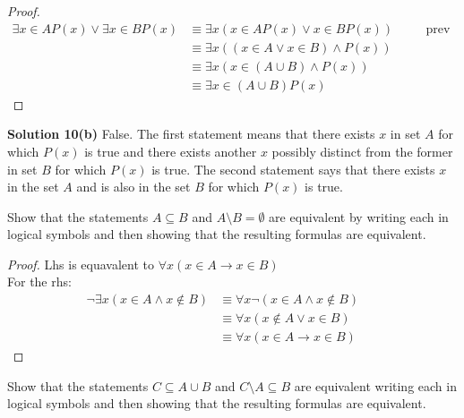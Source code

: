 \begin{proof}
    \begin{align*}
        \exists{x} \in A P(x) \vee \exists{x} \in B P(x) 
            &\equiv \exists{x} (x \in A P(x) \vee x \in B P(x)) && \quad \text {prev prob} \\
            &\equiv \exists{x} ((x \in A  \vee x \in B) \wedge P(x)) && \quad \text {} \\
            &\equiv \exists{x} (x \in (A \cup B) \wedge P(x)) && \quad \text {} \\
            &\equiv \exists{x}\in (A \cup B) P(x)
    \end{align*}
\end{proof}

\textbf{Solution 10(b)}
False. The first statement means that there exists $x$ in set $A$ for which $P(x)$ is true
and there exists another $x$ possibly distinct from the former in set $B$ for which $P(x)$
is true. The second statement says that there exists $x$ in the set $A$ and is also in the 
set $B$ for which $P(x)$ is true.

\begin{tcolorbox}[title=Problem 11, breakable]
    Show that the statements $A \subseteq B$ and $A \setminus B = \emptyset$ are equivalent
    by writing each in logical symbols and then showing that the resulting formulas are 
    equivalent.
\end{tcolorbox}

\begin{proof}
    Lhs is equavalent to $\forall{x}(x \in A \rightarrow x \in B)$ \\
    For the rhs: \\
    \begin{align*}
        \neg \exists{x}(x \in A \wedge x \not \in B)
            &\equiv \forall{x} \neg(x \in A \wedge x \not \in B) && \\
            &\equiv \forall{x} (x \not \in A \vee x \in B) && \\
            &\equiv \forall{x} (x \in A \rightarrow x \in B) 
    \end{align*}
\end{proof}

\begin{tcolorbox}[title=Problem 12, breakable]
    Show that the statements $C \subseteq A \cup B$ and $C \setminus A \subseteq B$ are
    equivalent writing each in logical symbols and then showing that the resulting formulas 
    are equivalent.
\end{tcolorbox}

